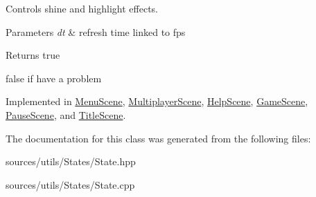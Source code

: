 Controls shine and highlight effects. 


\begin{DoxyParams}{Parameters}
{\em dt} & refresh time linked to fps \\
\hline
\end{DoxyParams}
\begin{DoxyReturn}{Returns}
true 

false if have a problem 
\end{DoxyReturn}


Implemented in \hyperlink{classMenuScene_ab18847a026d82d5ffe8c869bbf78725e}{Menu\+Scene}, \hyperlink{classMultiplayerScene_a7d55178de89a4de08bdd1aaa7561756e}{Multiplayer\+Scene}, \hyperlink{classHelpScene_a2eb8b8e49f206b65291a8972f3c596c0}{Help\+Scene}, \hyperlink{classGameScene_ac47e1a8082955a6c7af92cf7dbdd9347}{Game\+Scene}, \hyperlink{classPauseScene_ab1d5af95abe16f5d7a0cd98b9d1e1c96}{Pause\+Scene}, and \hyperlink{classTitleScene_a7da09182894a7a48a12ed0e170e5b5f3}{Title\+Scene}.



The documentation for this class was generated from the following files\+:\begin{DoxyCompactItemize}
\item 
sources/utils/\+States/State.\+hpp\item 
sources/utils/\+States/State.\+cpp\end{DoxyCompactItemize}
